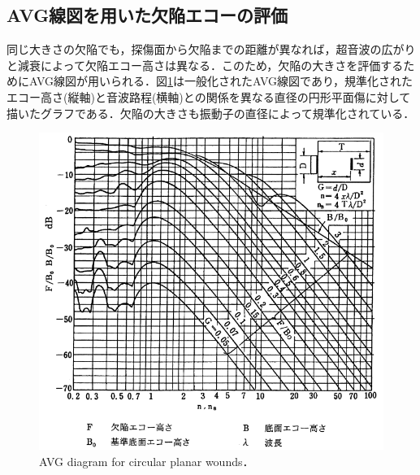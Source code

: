 \subsection{AVG線図を用いた欠陥エコーの評価}
同じ大きさの欠陥でも，探傷面から欠陥までの距離が異なれば，超音波の広がりと減衰によって欠陥エコー高さは異なる．このため，欠陥の大きさを評価するためにAVG線図が用いられる．図\ref{fig:AVG線図}は一般化されたAVG線図であり，規準化されたエコー高さ(縦軸)と音波路程(横軸)との関係を異なる直径の円形平面傷に対して描いたグラフである．欠陥の大きさも振動子の直径によって規準化されている．

\begin{figure}[htbp]
    \centering %
    \includegraphics[width=100truemm,clip]{fig/AVG線図.png}
    \caption{AVG diagram for circular planar wounds．}
    \label{fig:AVG線図}
\end{figure}
